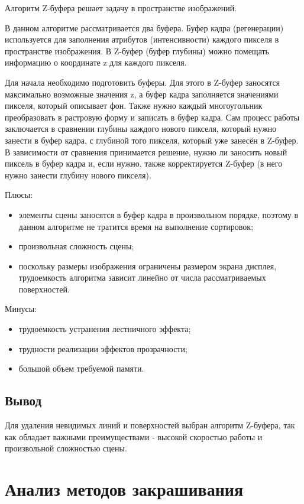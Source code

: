 Алгоритм Z-буфера решает задачу в пространстве изображений. 

В данном алгоритме рассматривается два буфера. Буфер кадра (регенерации) используется для заполнения атрибутов (интенсивности) каждого пикселя в пространстве изображения. В Z-буфер (буфер глубины) можно помещать информацию о координате z для каждого пикселя.

Для начала необходимо подготовить буферы. Для этого в Z-буфер заносятся максимально возможные значения z, а буфер кадра заполняется значениями пикселя, который описывает фон. Также нужно каждый многоугольник преобразовать в растровую форму и записать в буфер кадра. Сам процесс работы заключается в сравнении глубины каждого нового пикселя, который нужно занести в буфер кадра,
с глубиной того пикселя, который уже занесён в Z-буфер. В зависимости от сравнения принимается решение, нужно ли заносить новый пиксель в буфер кадра и, если нужно, также корректируется Z-буфер (в него нужно занести глубину нового пикселя).

Плюсы:
\begin{itemize}
	\item элементы сцены заносятся в буфер кадра в произвольном порядке, поэтому в данном алгоритме не тратится время на выполнение сортировок;
	\item произвольная сложность сцены;
	\item поскольку размеры изображения ограничены размером экрана дисплея, трудоемкость алгоритма зависит линейно от числа рассматриваемых поверхностей.
\end{itemize}

Минусы:
\begin{itemize}
	\item трудоемкость устранения лестничного эффекта;
	\item трудности реализации эффектов прозрачности;
	\item большой объем требуемой памяти.
\end{itemize}

\subsection*{Вывод}

Для удаления невидимых линий и поверхностей выбран алгоритм Z-буфера, так как обладает важными преимуществами - высокой скоростью работы и произвольной сложностью сцены.


\section{Анализ методов закрашивания}

